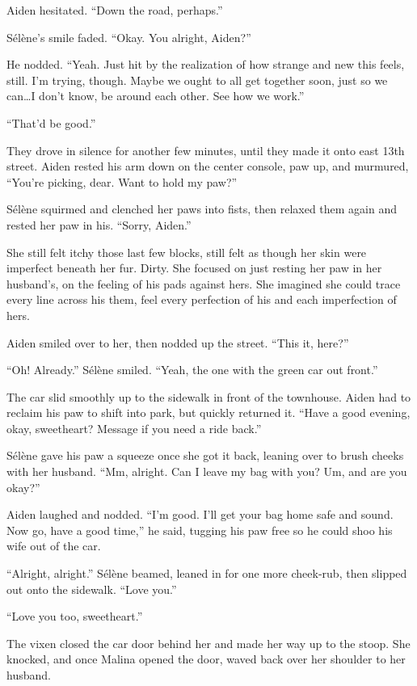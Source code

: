 Aiden hesitated. ``Down the road, perhaps.''

Sélène's smile faded. ``Okay. You alright, Aiden?''

He nodded. ``Yeah. Just hit by the realization of how strange and new this feels, still. I'm trying, though. Maybe we ought to all get together soon, just so we can\ldots{}I don't know, be around each other. See how we work.''

``That'd be good.''

They drove in silence for another few minutes, until they made it onto east 13th street. Aiden rested his arm down on the center console, paw up, and murmured, ``You're picking, dear. Want to hold my paw?''

Sélène squirmed and clenched her paws into fists, then relaxed them again and rested her paw in his. ``Sorry, Aiden.''

She still felt itchy those last few blocks, still felt as though her skin were imperfect beneath her fur. Dirty. She focused on just resting her paw in her husband's, on the feeling of his pads against hers. She imagined she could trace every line across his them, feel every perfection of his and each imperfection of hers.

Aiden smiled over to her, then nodded up the street. ``This it, here?''

``Oh! Already.'' Sélène smiled. ``Yeah, the one with the green car out front.''

The car slid smoothly up to the sidewalk in front of the townhouse. Aiden had to reclaim his paw to shift into park, but quickly returned it. ``Have a good evening, okay, sweetheart? Message if you need a ride back.''

Sélène gave his paw a squeeze once she got it back, leaning over to brush cheeks with her husband. ``Mm, alright. Can I leave my bag with you? Um, and are you okay?''

Aiden laughed and nodded. ``I'm good. I'll get your bag home safe and sound. Now go, have a good time,'' he said, tugging his paw free so he could shoo his wife out of the car.

``Alright, alright.'' Sélène beamed, leaned in for one more cheek-rub, then slipped out onto the sidewalk. ``Love you.''

``Love you too, sweetheart.''

The vixen closed the car door behind her and made her way up to the stoop. She knocked, and once Malina opened the door, waved back over her shoulder to her husband.

